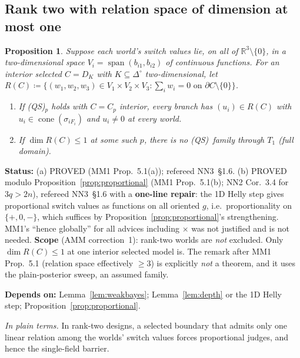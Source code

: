 \documentclass[11pt]{article}
\newtheorem{proposition}[theorem]{Proposition}
\theoremstyle{definition}
\theoremstyle{remark}
\newcommand{\R}{\mathbb R}
\newcommand{\Di}{\Delta^{\circ}}
\newcommand{\cone}{\operatorname{cone}}
\newcommand{\spn}{\operatorname{span}}
\newcommand{\src}[1]{\textsf{#1}}
\newcommand{\status}[1]{\par\smallskip\noindent\textbf{Status:} #1\par}
\newcommand{\deps}[1]{\noindent\textbf{Depends on:} #1\par}
\newcommand{\inwords}[1]{\noindent\textit{In plain terms.} #1\par\smallskip}
\newcommand{\QS}{\textup{(QS)}}
\begin{document}
\subsection{Rank two with relation space of dimension at most one}
\begin{proposition}\label{prop:rank2}
Suppose each world's switch values lie, on all of $\R^3\setminus\{0\}$, in a two-dimensional space $V_i=\spn(b_{i1},b_{i2})$ of continuous functions. For an interior selected $C=D_K$ with $K\subseteq\Di$ two-dimensional, let $R(C)\coloneqq\{(w_1,w_2,w_3)\in V_1\times V_2\times V_3:\sum_iw_i=0\text{ on }\partial C\setminus\{0\}\}$.
\begin{enumerate}[label=(\alph*)]
\item If \QS$_p$ holds with $C=C_p$ interior, every branch has $(u_i)\in R(C)$ with $u_i\in\cone(\sigma_{iF_i})$ and $u_i\ne0$ at every world.
\item If $\dim R(C)\le1$ at some such $p$, there is no \QS\ family through $T_1$ (full domain).
\end{enumerate}
\end{proposition}
\status{(a) PROVED (\src{MM1} Prop.~5.1(a)); refereed \src{NN3}~\S1.6. (b) PROVED modulo Proposition~\ref{prop:proportional} (\src{MM1} Prop.~5.1(b); \src{NN2} Cor.~3.4 for $3q>2n$), refereed \src{NN3}~\S1.6 with a \textbf{one-line repair}: the 1D Helly step gives proportional switch values as functions on all oriented $g$, i.e.\ proportionality on $\{+,0,-\}$, which suffices by Proposition~\ref{prop:proportional}'s strengthening. \src{MM1}'s ``hence globally'' for all advices including $\times$ was not justified and is not needed. \textbf{Scope} (\src{AMM} correction~1): rank-two worlds are \emph{not} excluded. Only $\dim R(C)\le1$ at one interior selected model is. The remark after \src{MM1} Prop.~5.1 (relation space effectively $\ge3$) is explicitly \emph{not} a theorem, and it uses the plain-posterior sweep, an assumed family.}
\deps{Lemma~\ref{lem:weakbayes}; Lemma~\ref{lem:depth} or the 1D Helly step; Proposition~\ref{prop:proportional}.}
\inwords{In rank-two designs, a selected boundary that admits only one linear relation among the worlds' switch values forces proportional judges, and hence the single-field barrier.}
\end{document}
